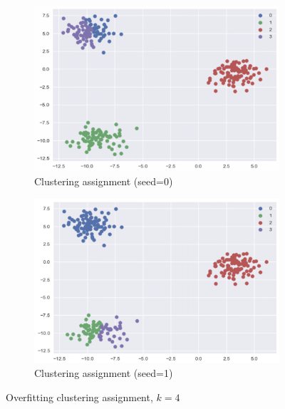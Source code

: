 \begin{figure}
     \centering
     \begin{subfigure}[b]{0.49\textwidth}
         \centering
         \includegraphics[width=\textwidth]{figures/design/cluster-soft-matching-1.png}
         \caption{Clustering assignment (seed=0)}
         \label{fig:clustering-soft-matching-1}
     \end{subfigure}
     \hfill
     \begin{subfigure}[b]{0.49\textwidth}
         \centering
         \includegraphics[width=\textwidth]{figures/design/cluster-soft-matching-2.png}
         \caption{Clustering assignment (seed=1)}
         \label{fig:clustering-soft-matching-2}
     \end{subfigure}
     \caption{Overfitting clustering assignment,  $k=4$}
     \label{fig:clustering-soft-matching}
\end{figure}

